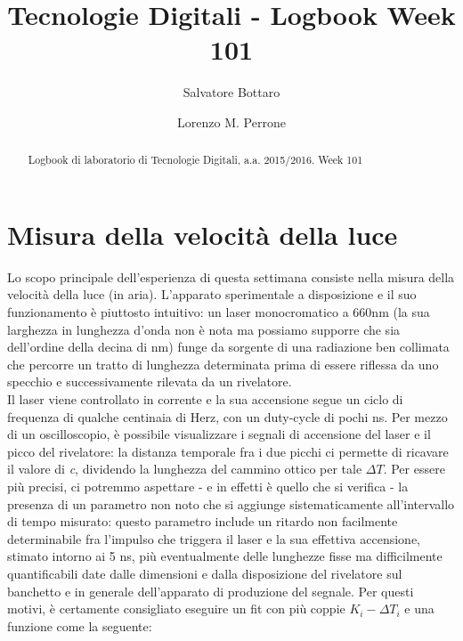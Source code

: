 \documentclass[journal, a4paper]{IEEEtran}
\begin{document}
	\title{Tecnologie Digitali - Logbook Week 101}
	\author[1]{Salvatore Bottaro}
		\author[2]{Lorenzo M. Perrone}
	\maketitle
	
\begin{abstract}
	Logbook di laboratorio di Tecnologie Digitali, a.a. 2015/2016. Week 101
\end{abstract}

\section{Misura della velocità della luce}
Lo scopo principale dell'esperienza di questa settimana consiste nella misura della velocità della luce (in aria). L'apparato sperimentale a disposizione e il suo funzionamento è piuttosto intuitivo: un laser monocromatico a 660nm (la sua larghezza in lunghezza d'onda non è nota ma possiamo supporre che sia dell'ordine della decina di nm) funge da sorgente di una radiazione ben collimata che percorre un tratto di lunghezza determinata prima di essere riflessa da uno specchio e successivamente rilevata da un rivelatore. \\
Il laser viene controllato in corrente e la sua accensione segue un ciclo di frequenza di qualche centinaia di Herz, con un duty-cycle di pochi ns. Per mezzo di un oscilloscopio, è possibile visualizzare i segnali di accensione del laser e il picco del rivelatore: la distanza temporale fra i due picchi ci permette di ricavare il valore di \textit{c}, dividendo la lunghezza del cammino ottico per tale $\Delta T$. Per essere più precisi, ci potremmo aspettare - e in effetti è quello che si verifica - la presenza di un parametro non noto che si aggiunge sistematicamente all'intervallo di tempo misurato: questo parametro include un ritardo non facilmente determinabile fra l'impulso che triggera il laser e la sua effettiva accensione, stimato intorno ai 5 ns, più eventualmente delle lunghezze fisse ma difficilmente quantificabili date dalle dimensioni e dalla disposizione del rivelatore sul banchetto e in generale dell'apparato di produzione del segnale. Per questi motivi, è certamente consigliato eseguire un fit con più coppie $K_i - \Delta T_i$ e una funzione come la seguente:
\end{document}
